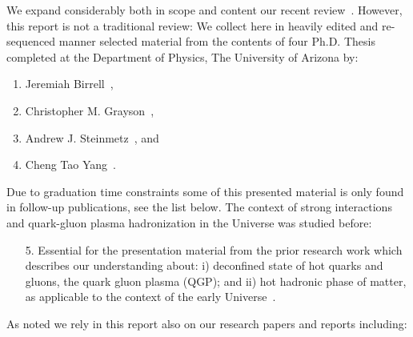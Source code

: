 We expand considerably both in scope and content our recent review~\cite{Rafelski:2023emw}. However, this report is not a traditional review: We collect here in heavily edited and re-sequenced manner selected material from the contents of four Ph.D. Thesis completed at the Department of Physics, The University of Arizona by:
\begin{enumerate}
\item Jeremiah Birrell~\cite{Birrell:2014ona},
\item Christopher M. Grayson~\cite{Grayson:2024okq},
\item Andrew J. Steinmetz~\cite{Steinmetz:2023ucp}, and
\item Cheng Tao Yang~\cite{Yang:2024ret}.
\end{enumerate}
Due to graduation time constraints some of this presented material is only found in follow-up publications, see the list below. The context of strong interactions and quark-gluon plasma hadronization in the Universe was studied before:
\begin{enumerate}
\item[5.] Essential for the presentation material from the prior research work  which describes our understanding about: i) deconfined state of hot quarks and gluons, the quark gluon plasma (QGP); and ii) hot hadronic phase of matter, as applicable to the context of the early Universe~\cite{Rafelski:2015cxa,Rafelski:2016hnq,Letessier:2002ony}.
\end{enumerate}
As noted we rely in this report also on our  research papers and reports including:
